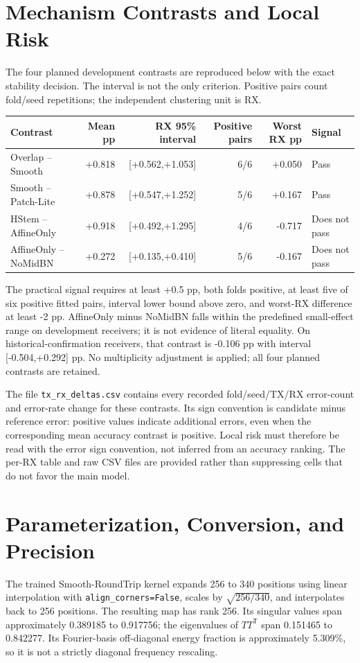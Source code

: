 \documentclass[11pt]{article}
\begin{document}


\section{Mechanism Contrasts and Local Risk}
The four planned development contrasts are reproduced below with the exact stability decision. The interval is not the only criterion. Positive pairs count fold/seed repetitions; the independent clustering unit is RX.

\begin{center}\small
\begin{tabular}{lrrrrl}\toprule
Contrast & Mean pp & RX 95\% interval & Positive pairs & Worst RX pp & Signal\\\midrule
Overlap -- Smooth & +0.818 & [+0.562,+1.053] & 6/6 & +0.050 & Pass\\
Smooth -- Patch-Lite & +0.878 & [+0.547,+1.252] & 5/6 & +0.167 & Pass\\
HStem -- AffineOnly & +0.918 & [+0.492,+1.295] & 4/6 & -0.717 & Does not pass\\
AffineOnly -- NoMidBN & +0.272 & [+0.135,+0.410] & 5/6 & -0.167 & Does not pass\\\bottomrule
\end{tabular}
\end{center}

The practical signal requires at least +0.5 pp, both folds positive, at least five of six positive fitted pairs, interval lower bound above zero, and worst-RX difference at least -2 pp. AffineOnly minus NoMidBN falls within the predefined small-effect range on development receivers; it is not evidence of literal equality. On historical-confirmation receivers, that contrast is -0.106 pp with interval [-0.504,+0.292] pp. No multiplicity adjustment is applied; all four planned contrasts are retained.

The file \texttt{tx\_rx\_deltas.csv} contains every recorded fold/seed/TX/RX error-count and error-rate change for these contrasts. Its sign convention is candidate minus reference error: positive values indicate additional errors, even when the corresponding mean accuracy contrast is positive. Local risk must therefore be read with the error sign convention, not inferred from an accuracy ranking. The per-RX table and raw CSV files are provided rather than suppressing cells that do not favor the main model.

\section{Parameterization, Conversion, and Precision}
The trained Smooth-RoundTrip kernel expands 256 to 340 positions using linear interpolation with \texttt{align\_corners=False}, scales by $\sqrt{256/340}$, and interpolates back to 256 positions. The resulting map has rank 256. Its singular values span approximately 0.389185 to 0.917756; the eigenvalues of $TT^{\mathsf T}$ span 0.151465 to 0.842277. Its Fourier-basis off-diagonal energy fraction is approximately 5.309\%, so it is not a strictly diagonal frequency rescaling.
\end{document}
